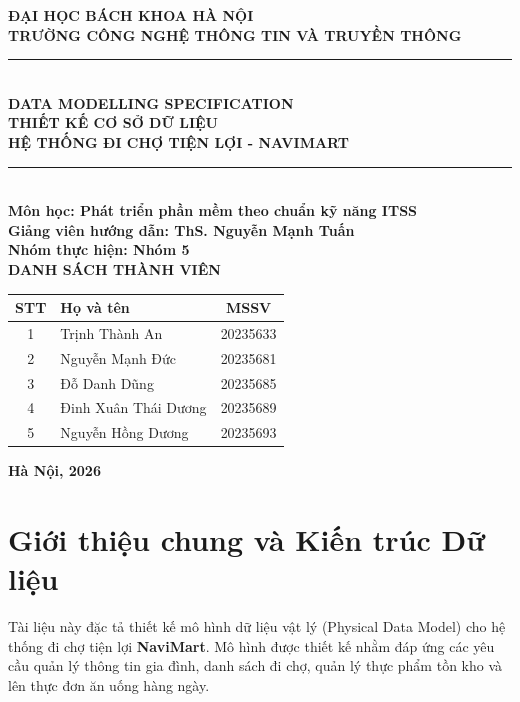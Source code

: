 \documentclass[12pt,a4paper]{article}
\begin{document}
\begin{titlepage}
    \begin{center}
        \textbf{\Large ĐẠI HỌC BÁCH KHOA HÀ NỘI} \\
        \textbf{\Large TRƯỜNG CÔNG NGHỆ THÔNG TIN VÀ TRUYỀN THÔNG} \\
        \vskip 3cm
        \noindent\rule{\textwidth}{2pt} \\
        \vskip 0.6cm
        \textbf{\Huge DATA MODELLING SPECIFICATION} \\[0.5em]
        \textbf{\huge THIẾT KẾ CƠ SỞ DỮ LIỆU} \\[0.5em]
        \textbf{\Large HỆ THỐNG ĐI CHỢ TIỆN LỢI - NAVIMART} \\
        \noindent\rule{\textwidth}{2pt} \\
        \vskip 1.5cm
        \textbf{\large Môn học: Phát triển phần mềm theo chuẩn kỹ năng ITSS} \\
        \textbf{\large Giảng viên hướng dẫn: ThS. Nguyễn Mạnh Tuấn} \\
        \textbf{\large Nhóm thực hiện: Nhóm 5} \\
        \vskip 1.5cm
        \textbf{\large DANH SÁCH THÀNH VIÊN} \\
        \vskip 0.4cm
        \begin{tabular}{|c|l|c|}
            \hline
            \textbf{STT} & \textbf{Họ và tên} & \textbf{MSSV} \\
            \hline
            1 & Trịnh Thành An & 20235633 \\
            \hline
            2 & Nguyễn Mạnh Đức & 20235681 \\
            \hline
            3 & Đỗ Danh Dũng & 20235685 \\
            \hline
            4 & Đinh Xuân Thái Dương & 20235689 \\
            \hline
            5 & Nguyễn Hồng Dương & 20235693 \\
            \hline
        \end{tabular}
        \vfill
        \textbf{Hà Nội, 2026}
    \end{center}
\end{titlepage}

\tableofcontents
\newpage

\section{Giới thiệu chung và Kiến trúc Dữ liệu}
Tài liệu này đặc tả thiết kế mô hình dữ liệu vật lý (Physical Data Model) cho hệ thống đi chợ tiện lợi \textbf{NaviMart}. Mô hình được thiết kế nhằm đáp ứng các yêu cầu quản lý thông tin gia đình, danh sách đi chợ, quản lý thực phẩm tồn kho và lên thực đơn ăn uống hàng ngày.
\end{document}
